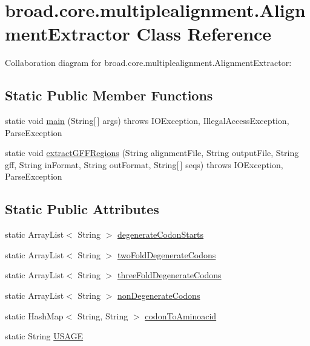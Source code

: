 \hypertarget{classbroad_1_1core_1_1multiplealignment_1_1_alignment_extractor}{\section{broad.\+core.\+multiplealignment.\+Alignment\+Extractor Class Reference}
\label{classbroad_1_1core_1_1multiplealignment_1_1_alignment_extractor}
}


Collaboration diagram for broad.\+core.\+multiplealignment.\+Alignment\+Extractor\+:
\subsection*{Static Public Member Functions}
\begin{DoxyCompactItemize}
\item 
static void \hyperlink{classbroad_1_1core_1_1multiplealignment_1_1_alignment_extractor_a48d2b8b5d5fdbcc0caae3d2e29e049f2}{main} (String\mbox{[}$\,$\mbox{]} args)  throws I\+O\+Exception, Illegal\+Access\+Exception, Parse\+Exception 
\item 
static void \hyperlink{classbroad_1_1core_1_1multiplealignment_1_1_alignment_extractor_a953ec88a63df9ac98e99814792206a06}{extract\+G\+F\+F\+Regions} (String alignment\+File, String output\+File, String gff, String in\+Format, String out\+Format, String\mbox{[}$\,$\mbox{]} seqs)  throws I\+O\+Exception, Parse\+Exception 
\end{DoxyCompactItemize}
\subsection*{Static Public Attributes}
\begin{DoxyCompactItemize}
\item 
static Array\+List$<$ String $>$ \hyperlink{classbroad_1_1core_1_1multiplealignment_1_1_alignment_extractor_a6ca872097ad7ccf33de84c89dfbd7482}{degenerate\+Codon\+Starts}
\item 
static Array\+List$<$ String $>$ \hyperlink{classbroad_1_1core_1_1multiplealignment_1_1_alignment_extractor_ae2657f7145b67391c691ff34cf8b1b79}{two\+Fold\+Degenerate\+Codons}
\item 
static Array\+List$<$ String $>$ \hyperlink{classbroad_1_1core_1_1multiplealignment_1_1_alignment_extractor_a4e9a8a4f7ce3eb57cd3f1e92ba30bacb}{three\+Fold\+Degenerate\+Codons}
\item 
static Array\+List$<$ String $>$ \hyperlink{classbroad_1_1core_1_1multiplealignment_1_1_alignment_extractor_a97d857eef06955fef14372779a2e7e0f}{non\+Degenerate\+Codons}
\item 
static Hash\+Map$<$ String, String $>$ \hyperlink{classbroad_1_1core_1_1multiplealignment_1_1_alignment_extractor_a26170c7f5b1f3f17effd444c1ddcd9f4}{codon\+To\+Aminoacid}
\item 
static String \hyperlink{classbroad_1_1core_1_1multiplealignment_1_1_alignment_extractor_a3a667e09923b9b2c3de38373900c8151}{U\+S\+A\+G\+E}
\end{DoxyCompactItemize}


